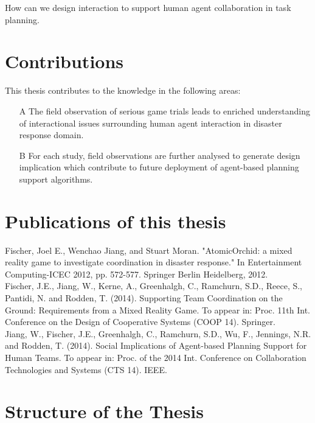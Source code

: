 How can we design interaction to support human agent collaboration in task planning. 

\section{Contributions} 
This thesis contributes to the knowledge in the following areas: \\
\begin{enumerate}
  \item[A] The field observation of serious game trials leads to enriched understanding of interactional issues surrounding human agent interaction in disaster response domain.
  
  \item[B] For each study, field observations are further analysed to generate design implication which contribute to future deployment of agent-based planning support algorithms. 
\end{enumerate}

\section{Publications of this thesis} 
Fischer, Joel E., Wenchao Jiang, and Stuart Moran. "AtomicOrchid: a mixed reality game to investigate coordination in disaster response." In Entertainment Computing-ICEC 2012, pp. 572-577. Springer Berlin Heidelberg, 2012.\\

\noindent Fischer, J.E., Jiang, W., Kerne, A., Greenhalgh, C., Ramchurn, S.D., Reece, S., Pantidi, N. and Rodden, T. (2014). Supporting Team Coordination on the Ground: Requirements from a Mixed Reality Game. To appear in: Proc. 11th Int. Conference on the Design of Cooperative Systems (COOP 14). Springer.\\

\noindent Jiang, W., Fischer, J.E., Greenhalgh, C., Ramchurn, S.D., Wu, F., Jennings, N.R. and Rodden, T. (2014). Social Implications of Agent-based Planning Support for Human Teams. To appear in: Proc. of the 2014 Int. Conference on Collaboration Technologies and Systems (CTS 14). IEEE.\\





\section{Structure of the Thesis}







